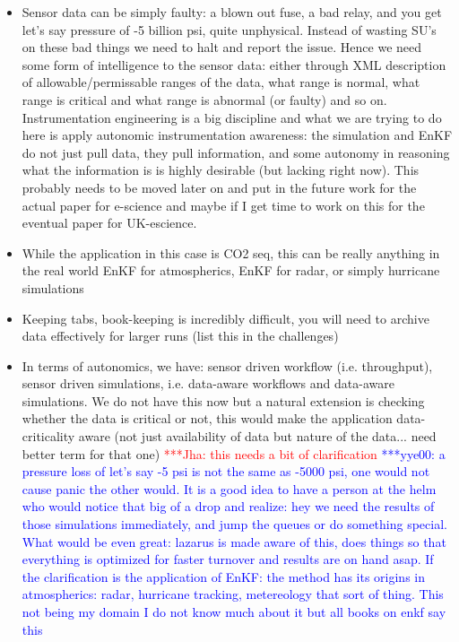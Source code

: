 \documentclass[conference,draft]{IEEEtran}
\newcommand{\jhanote}[1]{ {\textcolor{red} { ***Jha: #1 }}}
\newcommand{\yyenote}[1]{ {\textcolor{blue} { ***yye00: #1 }}}
\newcommand{\jhanote}[1]{}
\newcommand{\yyenote}[1]{}
\begin{document}
\begin{itemize}
\item Sensor data can be simply faulty: a blown out fuse, a bad relay, and you get let's say pressure of -5 billion psi, quite unphysical. Instead of wasting SU's on these bad things we need to halt and report the issue. Hence we need some form of intelligence to the sensor data: either through XML description of allowable/permissable ranges of the data, what range is normal, what range is critical and what range is abnormal (or faulty) and so on. Instrumentation engineering is a big discipline and what we are trying to do here is apply autonomic instrumentation awareness: the simulation and EnKF do not just pull data, they pull information, and some autonomy in reasoning what the information is is highly desirable (but lacking right now). This probably needs to be moved later on and put in the future work for the actual paper for e-science and maybe if I get time to work on this for the eventual paper for UK-escience.

\item While the application in this case is CO2 seq, this can be really anything in the real world EnKF for atmospherics, EnKF for radar, or simply hurricane simulations 

\item Keeping tabs, book-keeping is incredibly difficult, you will need to archive data effectively for larger runs (list this in the challenges) \item In terms of autonomics, we have: sensor driven workflow (i.e. throughput), sensor driven simulations, i.e. data-aware workflows and data-aware simulations. We do not have this now but a natural extension is checking whether the data is critical or not, this would make the application data-criticality aware (not just availability of data but nature of the data... need better term for that one) \jhanote{this needs a bit of clarification} \yyenote{a pressure loss of let's say -5 psi is not the same as -5000 psi, one would not cause panic the other would. It is a good idea to have a person at the helm who would notice that big of a drop and realize: hey we need the results of those simulations immediately, and jump the queues or do something special. What would be even great: lazarus is made aware of this, does things so that everything is optimized for faster turnover and results are on hand asap. If the clarification is the application of EnKF: the method has its origins in atmospherics: radar, hurricane tracking, metereology that sort of thing. This not being my domain I do not know much about it but all books on enkf say this}


\end{itemize}
\end{document}
